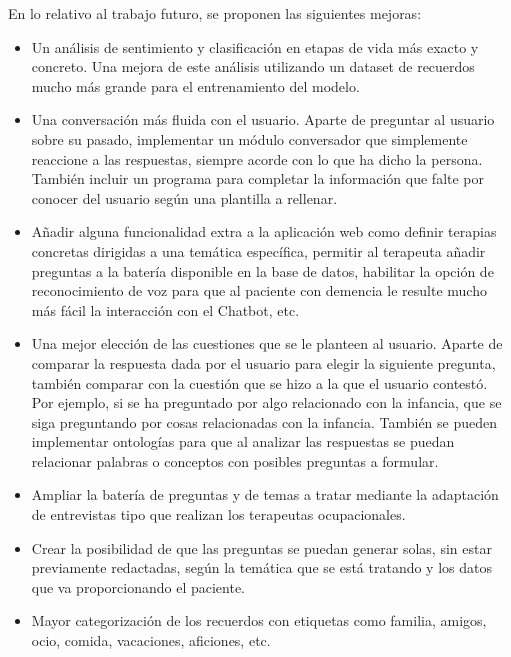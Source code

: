 En lo relativo al trabajo futuro, se proponen las siguientes mejoras:
\begin{itemize}
	\item Un análisis de sentimiento y clasificación en etapas de vida más exacto y concreto. Una mejora de este análisis utilizando un dataset de recuerdos mucho más grande para el entrenamiento del modelo. 
	\item Una conversación más fluida con el usuario. Aparte de preguntar al usuario sobre su pasado, implementar un módulo conversador que simplemente reaccione a las respuestas, siempre acorde con lo que ha dicho la persona. También incluir un programa para completar la información que falte por conocer del usuario según una plantilla a rellenar.
	\item Añadir alguna funcionalidad extra a la aplicación web como definir terapias concretas dirigidas a una temática específica, permitir al terapeuta añadir preguntas a la batería disponible en la base de datos, habilitar la opción de reconocimiento de voz para que al paciente con demencia le resulte mucho más fácil la interacción con el Chatbot, etc.
	\item Una mejor elección de las cuestiones que se le planteen al usuario. Aparte de comparar la respuesta dada por el usuario para elegir la siguiente pregunta, también comparar con la cuestión que se hizo a la que el usuario contestó. Por ejemplo, si se ha preguntado por algo relacionado con la infancia, que se siga preguntando por cosas relacionadas con la infancia. También se pueden implementar ontologías para que al analizar las respuestas se puedan relacionar palabras o conceptos con posibles preguntas a formular.
	\item Ampliar la batería de preguntas y de temas a tratar mediante la adaptación de entrevistas tipo que realizan los terapeutas ocupacionales.
	\item Crear la posibilidad de que las preguntas se puedan generar solas, sin estar previamente redactadas, según la temática que se está tratando y los datos que va proporcionando el paciente. 
	\item Mayor categorización de los recuerdos con etiquetas como familia, amigos, ocio, comida, vacaciones, aficiones, etc. 
\end{itemize}